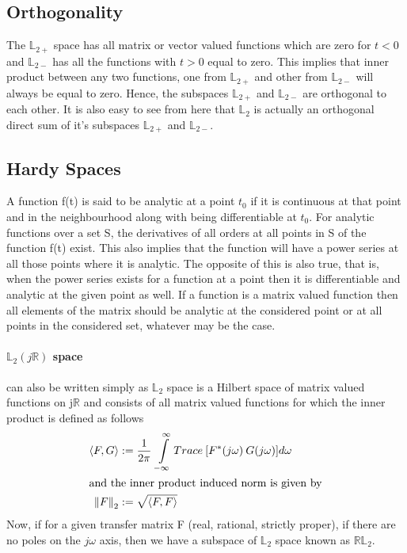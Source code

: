\documentclass[a4paper,12pt]{article}
\newcommand\norm[1]{\left\lVert#1\right\rVert}
\begin{document}
	\subsection{Orthogonality}
	The $\mathbb{L}_{2+}$ space has all matrix or vector valued functions which are zero for $t<0$ and $\mathbb{L}_{2-}$ has all the functions with $t>0$ equal to zero. This implies that inner product between any two functions, one from $\mathbb{L}_{2+}$ and other from $\mathbb{L}_{2-}$ will always be equal to zero. Hence, the subspaces $\mathbb{L}_{2+}$ and $\mathbb{L}_{2-}$ are orthogonal to each other. It is also easy to see from here that $\mathbb{L}_{2}$ is actually an orthogonal direct sum of it's subspaces $\mathbb{L}_{2+}$ and $\mathbb{L}_{2-}$.
	
	\subsection{Hardy Spaces}
		A function f(t) is said to be analytic at a point $t_{0}$ if it is continuous at that point and in the neighbourhood along with being differentiable at $t_{0}$. For analytic functions over a set S, the derivatives of all orders at all points in S of the function f(t) exist. This also implies that the function will have a power series at all those points where it is analytic. The opposite of this is also true, that is, when the power series exists for a function at a point then it is differentiable and analytic at the given point as well. If a function is a matrix valued function then all elements of the matrix should be analytic at the considered point or at all points in the considered set, whatever may be the case. \\
		\paragraph{$\mathbb{L}_{2}(j\mathbb{R})$ space} can also be written simply as $\mathbb{L}_{2}$ space is a Hilbert space of matrix valued functions on j$\mathbb{R}$ and consists of all matrix valued functions for which the inner product is defined as follows
		\begin{align}
			 \left\langle F, G \right\rangle &:= \frac{1}{2\pi} \: \int\limits_{-\infty}^\infty Trace \: [F^{*}(j\omega)\:G(j\omega)]d\omega \label{inner}\\
			 \intertext{and the inner product induced norm is given by}
			 \norm{F}_{2} &:= \sqrt{\left\langle F, F \right\rangle}
		\end{align}
		Now, if for a given transfer matrix F (real, rational, strictly proper), if there are no poles on the $j\omega$ axis, then we have a subspace of $\mathbb{L}_{2}$ space known as $\mathbb{RL}_{2}$.
		 
\end{document}
